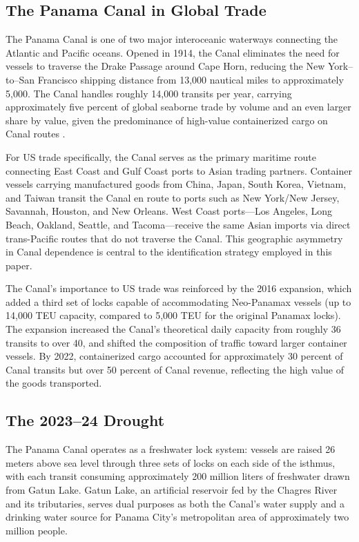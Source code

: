 \documentclass[12pt]{article}
\begin{document}
\subsection{The Panama Canal in Global Trade}

The Panama Canal is one of two major interoceanic waterways connecting the Atlantic and Pacific oceans. Opened in 1914, the Canal eliminates the need for vessels to traverse the Drake Passage around Cape Horn, reducing the New York--to--San Francisco shipping distance from 13,000 nautical miles to approximately 5,000. The Canal handles roughly 14,000 transits per year, carrying approximately five percent of global seaborne trade by volume and an even larger share by value, given the predominance of high-value containerized cargo on Canal routes \citep{maurer2011role}.

For US trade specifically, the Canal serves as the primary maritime route connecting East Coast and Gulf Coast ports to Asian trading partners. Container vessels carrying manufactured goods from China, Japan, South Korea, Vietnam, and Taiwan transit the Canal en route to ports such as New York/New Jersey, Savannah, Houston, and New Orleans. West Coast ports---Los Angeles, Long Beach, Oakland, Seattle, and Tacoma---receive the same Asian imports via direct trans-Pacific routes that do not traverse the Canal. This geographic asymmetry in Canal dependence is central to the identification strategy employed in this paper.

The Canal's importance to US trade was reinforced by the 2016 expansion, which added a third set of locks capable of accommodating Neo-Panamax vessels (up to 14,000 TEU capacity, compared to 5,000 TEU for the original Panamax locks). The expansion increased the Canal's theoretical daily capacity from roughly 36 transits to over 40, and shifted the composition of traffic toward larger container vessels. By 2022, containerized cargo accounted for approximately 30 percent of Canal transits but over 50 percent of Canal revenue, reflecting the high value of the goods transported.

\subsection{The 2023--24 Drought}

The Panama Canal operates as a freshwater lock system: vessels are raised 26 meters above sea level through three sets of locks on each side of the isthmus, with each transit consuming approximately 200 million liters of freshwater drawn from Gatun Lake. Gatun Lake, an artificial reservoir fed by the Chagres River and its tributaries, serves dual purposes as both the Canal's water supply and a drinking water source for Panama City's metropolitan area of approximately two million people.
\end{document}
